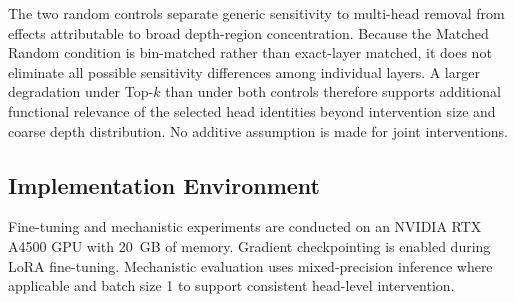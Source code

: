The two random controls separate generic sensitivity to multi-head removal from effects attributable to broad depth-region concentration. Because the Matched Random condition is bin-matched rather than exact-layer matched, it does not eliminate all possible sensitivity differences among individual layers. A larger degradation under Top-$k$ than under both controls therefore supports additional functional relevance of the selected head identities beyond intervention size and coarse depth distribution. No additive assumption is made for joint interventions.

\subsection{Implementation Environment}
\label{sec:implementation_environment}

Fine-tuning and mechanistic experiments are conducted on an NVIDIA RTX A4500 GPU with 20~GB of memory. Gradient checkpointing is enabled during LoRA fine-tuning. Mechanistic evaluation uses mixed-precision inference where applicable and batch size 1 to support consistent head-level intervention.

